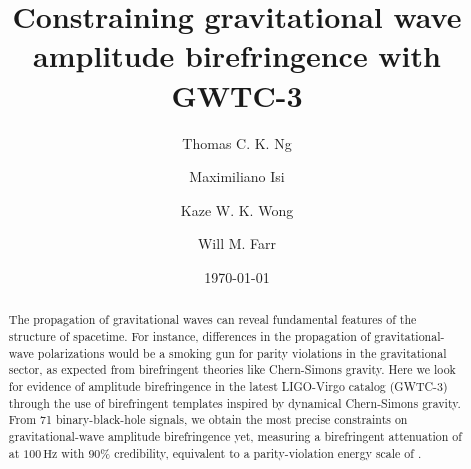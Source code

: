 \documentclass[aps,prd,twocolumn,superscriptaddress,preprintnumbers,nofootinbib]{revtex4-2}
\begin{document}
\title{Constraining gravitational wave amplitude birefringence with GWTC-3}

\author{Thomas C. K. Ng}

\author{Maximiliano Isi}

\author{Kaze W. K. Wong}

\author{Will M. Farr}

\date{\today}

\begin{abstract}
    The propagation of gravitational waves can reveal fundamental features of the structure of spacetime.
    For instance, differences in the propagation of gravitational-wave polarizations would be a smoking gun for parity violations in the gravitational sector, as expected from birefringent theories like Chern-Simons gravity.
    Here we look for evidence of amplitude birefringence in the latest LIGO-Virgo catalog (GWTC-3) through the use of birefringent templates inspired by dynamical Chern-Simons gravity.
    From 71 binary-black-hole signals, we obtain the most precise constraints on gravitational-wave amplitude birefringence yet, measuring a birefringent attenuation of  at $100 \, \mathrm{Hz}$ with 90\% credibility, equivalent to a parity-violation energy scale of .
\end{abstract}

\maketitle

\begin{acronym}
\end{acronym}
\end{document}
